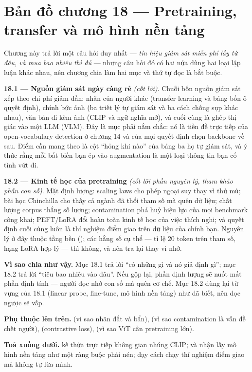 \documentclass[../../deep_learning.tex]{subfiles}
\begin{document}
\section*{Bản đồ chương 18 --- Pretraining, transfer và mô hình nền tảng}

Chương này trả lời một câu hỏi duy nhất --- \emph{tín hiệu giám sát miễn phí lấy từ đâu, và mua bao nhiêu thì đủ} --- nhưng câu hỏi đó có hai nửa dùng hai loại lập luận khác nhau, nên chương chia làm hai mục và thứ tự đọc là bắt buộc.

\textbf{18.1 --- Nguồn giám sát ngày càng rẻ}  \emph{(cốt lõi)}. Chuỗi bốn nguồn giám sát xếp theo chi phí giảm dần: nhãn của người khác (transfer learning và bảng bốn ô quyết định), chính bức ảnh (ba triết lý tự giám sát và ba cách chống sụp khác nhau), văn bản đi kèm ảnh (CLIP và ngữ nghĩa mở), và cuối cùng là ghép thị giác vào một LLM (VLM). Đây là mục phải nắm chắc: nó là tiền đề trực tiếp của open-vocabulary detection ở chương 14 và của mọi quyết định chọn backbone về sau. Điểm cần mang theo là cột ``hỏng khi nào'' của bảng ba họ tự giám sát, và ý thức rằng mỗi bất biến bạn ép vào augmentation là một loại thông tin bạn cố tình vứt đi.

\textbf{18.2 --- Kinh tế học của pretraining}  \emph{(cốt lõi phần nguyên lý, tham khảo phần con số)}. Mặt định lượng: scaling laws cho phép ngoại suy thay vì thử mù; bài học Chinchilla cho thấy cả ngành đã thổi tham số mà quên dữ liệu; chất lượng corpus thắng số lượng; contamination phá huỷ hiệu lực của mọi benchmark công khai; PEFT/LoRA đổi hoàn toàn kinh tế học của việc thích nghi; và quyết định cuối cùng luôn là thí nghiệm điểm giao trên dữ liệu của chính bạn. Nguyên lý ở đây thuộc tầng bền (); các hằng số cụ thể --- tỉ lệ 20 token trên tham số, hạng LoRA hợp lý --- thì không, và nên tra lại thay vì nhớ.

\textbf{Vì sao chia như vậy.} Mục 18.1 trả lời ``có những gì và nó giả định gì''; mục 18.2 trả lời ``tiêu bao nhiêu vào đâu''. Nếu gộp lại, phần định lượng sẽ nuốt mất phần định tính --- người đọc nhớ con số mà quên cơ chế. Mục 18.2 dùng lại từ vựng của 18.1 (linear probe, fine-tune, mô hình nền tảng) như đã biết, nên đọc ngược sẽ vấp.

\textbf{Phụ thuộc lên trên.}  (vì sao nhãn đắt và bẩn),  (vì sao contamination là vấn đề chết người),  (contrastive loss),  (vì sao ViT cần pretraining lớn).

\textbf{Toả xuống dưới.}  kế thừa trực tiếp không gian nhúng CLIP;  và  nhận lấy mô hình nền tảng như một ràng buộc phải nén;  dạy cách chạy thí nghiệm điểm giao mà không tự lừa mình.
\end{document}
